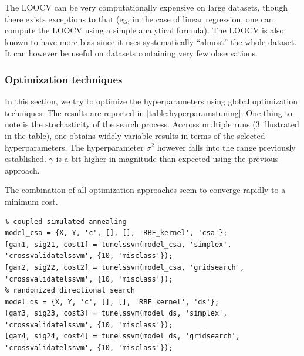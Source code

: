 \documentclass[11pt, a4paper]{article}
\begin{document}
The LOOCV can be very computationally expensive on large datasets,
though there exists exceptions to that (eg, in the case of linear
regression, one can compute the LOOCV using a simple analytical
formula). The LOOCV is also known to have more bias since it uses
systematically ``almost'' the whole dataset. It can however be useful
on datasets containing very few observations.

\subsubsection{Optimization techniques}

In this section, we try to optimize the hyperparameters using global
optimization techniques. The results are reported in
\ref{table:hyperparamstuning}. One thing to note is the stochasticity
of the search process. Accross multiple runs (3 illustrated in the
table), one obtains widely variable results in terms of the selected
hyperparameters. The hyperparameter $\sigma^2$ however falls into the
range previously established. $\gamma$ is a bit higher in magnitude
than expected using the previous approach.

The combination of all optimization approaches seem to converge
rapidly to a minimum cost.

\begin{lstlisting}
% coupled simulated annealing
model_csa = {X, Y, 'c', [], [], 'RBF_kernel', 'csa'};
[gam1, sig21, cost1] = tunelssvm(model_csa, 'simplex', 'crossvalidatelssvm', {10, 'misclass'});
[gam2, sig22, cost2] = tunelssvm(model_csa, 'gridsearch', 'crossvalidatelssvm', {10, 'misclass'});
% randomized directional search
model_ds = {X, Y, 'c', [], [], 'RBF_kernel', 'ds'};
[gam3, sig23, cost3] = tunelssvm(model_ds, 'simplex', 'crossvalidatelssvm', {10, 'misclass'});
[gam4, sig24, cost4] = tunelssvm(model_ds, 'gridsearch', 'crossvalidatelssvm', {10, 'misclass'});
\end{lstlisting}
\end{document}
